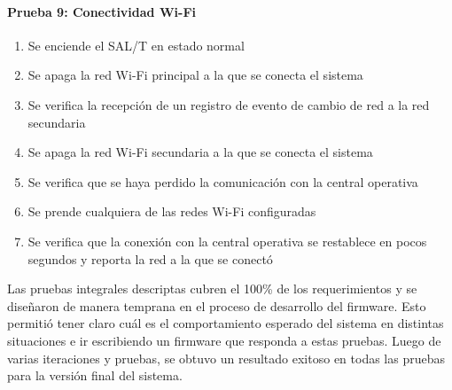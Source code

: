 \paragraph{Prueba 9: Conectividad Wi-Fi}
\begin{enumerate}
\item	Se enciende el SAL/T en estado normal
\item	Se apaga la red Wi-Fi principal a la que se conecta el sistema
\item	Se verifica la recepción de un registro de evento de cambio de red a la red secundaria
\item	Se apaga la red Wi-Fi secundaria a la que se conecta el sistema
\item	Se verifica que se haya perdido la comunicación con la central operativa
\item	Se prende cualquiera de las redes Wi-Fi configuradas
\item	Se verifica que la conexión con la central operativa se restablece en pocos segundos y reporta la red a la que se conectó

\end{enumerate}




Las pruebas integrales descriptas cubren el 100\% de los requerimientos y se diseñaron de manera temprana en el proceso de desarrollo del firmware. Esto permitió tener claro cuál es el comportamiento esperado del sistema en distintas situaciones e ir escribiendo un firmware que responda a estas pruebas. Luego de varias iteraciones y pruebas, se obtuvo un resultado exitoso en todas las pruebas para la versión final del sistema. 